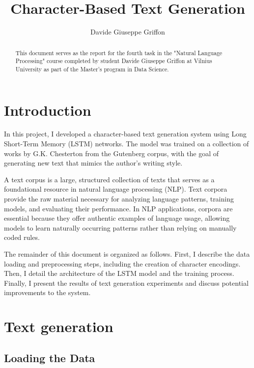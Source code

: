 \documentclass[12pt]{article}
\title{Character-Based Text Generation}
\author{Davide Giuseppe Griffon}
\date{}
\begin{document}
\maketitle

\begin{abstract}
    This document serves as the report for the fourth task in the "Natural Language Processing" course completed by student Davide Giuseppe Griffon at Vilnius University as part of the Master's program in Data Science.
\end{abstract}

\tableofcontents

\newpage



\section{Introduction}

In this project, I developed a character-based text generation system using Long Short-Term Memory (LSTM) networks. The model was trained on a collection of works by G.K. Chesterton from the Gutenberg corpus, with the goal of generating new text that mimics the author's writing style.

A text corpus is a large, structured collection of texts that serves as a foundational resource in natural language processing (NLP). Text corpora provide the raw material necessary for analyzing language patterns, training models, and evaluating their performance. In NLP applications, corpora are essential because they offer authentic examples of language usage, allowing models to learn naturally occurring patterns rather than relying on manually coded rules. 

The remainder of this document is organized as follows. First, I describe the data loading and preprocessing steps, including the creation of character encodings. Then, I detail the architecture of the LSTM model and the training process. Finally, I present the results of text generation experiments and discuss potential improvements to the system.

\section{Text generation}

\subsection{Loading the Data}
\end{document}
